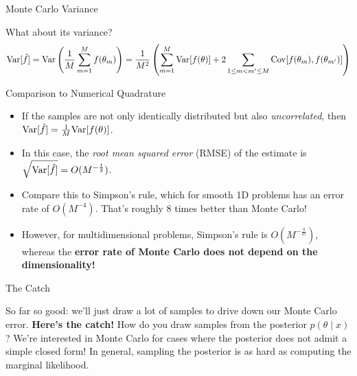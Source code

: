 \documentclass[aspectratio=169]{beamer}
\begin{document}
\begin{frame}[t,allowframebreaks]{Monte Carlo Variance}\label{monte-carlo-variance}

What about its variance? \begin{align*}
\textrm{Var}[\hat{f}] = \textrm{Var} \left(\frac{1}{M} \sum_{m=1}^M f(\theta_m) \right) = \frac{1}{M^2} \left( \sum_{m=1}^M \textrm{Var}[f(\theta)] + 2 \sum_{1 \leq m < m' \leq M} \mathrm{Cov} [f(\theta_m), f(\theta_{m'})] \right)
\end{align*}
\end{frame}

\begin{frame}[t,allowframebreaks]{Comparison to Numerical
Quadrature}\label{comparison-to-numerical-quadrature}

\begin{itemize}
\item
  If the samples are not only identically distributed but also
  \emph{uncorrelated}, then
  \(\textrm{Var}[\hat{f}] = \frac{1}{M} \textrm{Var}[f(\theta)]\).
\item
  In this case, the \emph{root mean squared error} (RMSE) of the
  estimate is \(\sqrt{\textrm{Var}[\hat{f}]} = O(M^{-\frac{1}{2}})\).
\item
  Compare this to Simpson's rule, which for smooth 1D problems has an
  error rate of \(O(M^{-4})\). That's roughly 8 times better than Monte
  Carlo!
\item
  However, for multidimensional problems, Simpson's rule is
  \(O(M^{-\frac{4}{D}})\), whereas the \textbf{error rate of Monte Carlo
  does not depend on the dimensionality!}
\end{itemize}
\end{frame}

\begin{frame}[t,allowframebreaks]{The Catch}\label{the-catch}

So far so good: we'll just draw a lot of samples to drive down our Monte
Carlo error. \textbf{Here's the catch!} How do you draw samples from the
posterior \(p(\theta \mid x)\)? We're interested in Monte Carlo for
cases where the posterior does not admit a simple closed form! In
general, sampling the posterior is as hard as computing the marginal
likelihood.
\end{frame}
\end{document}
